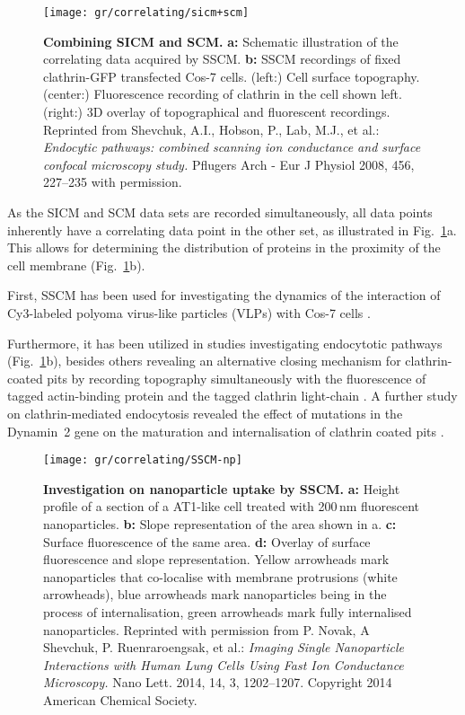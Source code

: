 \begin{figure}
  \texttt{[image: gr/correlating/sicm+scm]}
  \caption{%
    \textbf{Combining SICM and SCM.}
    \textbf{a:} Schematic illustration of the correlating data acquired by SSCM.
    \textbf{b:} SSCM recordings of fixed clathrin-GFP transfected Cos-7 cells. 
    	(left:) Cell surface topography. 
    	(center:) Fluorescence recording of clathrin in the cell shown left. 
    	(right:) 3D overlay of topographical and fluorescent recordings. 
    Reprinted from Shevchuk, A.I., Hobson, P., Lab, M.J., et al.: \emph{Endocytic
    pathways: combined scanning ion conductance and surface confocal
    microscopy study.} Pflugers Arch - Eur J Physiol 2008, 456, 227–235 with permission.
  }
  \label{fig:sicm+scm}
\end{figure}

As the SICM and SCM data sets are recorded simultaneously, all data points
inherently have a correlating data point in the other set, as illustrated in
Fig.~\ref{fig:sicm+scm}a. This allows for determining the distribution of
proteins in the proximity of the cell membrane (Fig.~\ref{fig:sicm+scm}b).



First, SSCM has been used for investigating the dynamics of the interaction of
Cy3-labeled polyoma virus-like particles (VLPs) with Cos-7 cells
\cite{Gorelik2002a}.

Furthermore, it has been utilized in studies investigating endocytotic
pathways \cite{Shevchuk2008a} (Fig.~\ref{fig:sicm+scm}b), besides others
revealing an alternative closing mechanism for clathrin-coated pits by
recording topography simultaneously with the fluorescence of tagged
actin-binding protein and the tagged clathrin light-chain
\cite{Shevchuk2012}. A further study on clathrin-mediated endocytosis revealed
the effect of mutations in the Dynamin~2 gene on the maturation and
internalisation of clathrin coated pits \cite{Ali2019}.

\begin{figure}
  \centering
  \texttt{[image: gr/correlating/SSCM-np]}
  \caption{%
    \textbf{Investigation on nanoparticle uptake by SSCM.}  \textbf{a:} Height
    profile of a section of a AT1-like cell treated with 200\,nm fluorescent
    nanoparticles.  \textbf{b:} Slope representation of the area shown in a.
    \textbf{c:} Surface fluorescence of the same area.  \textbf{d:} Overlay
    of surface fluorescence and slope representation. Yellow arrowheads mark
    nanoparticles that co-localise with membrane protrusions (white
    arrowheads), blue arrowheads mark nanoparticles being in the process of
    internalisation, green arrowheads mark fully internalised nanoparticles.
    Reprinted with permission from P. Novak, A Shevchuk, P. Ruenraroengsak, et
    al.: \emph{Imaging Single Nanoparticle Interactions with Human Lung Cells
      Using Fast Ion Conductance Microscopy.} Nano Lett. 2014, 14, 3,
    1202–1207. Copyright 2014 American Chemical Society.}
  \label{fig:sscm-np}
\end{figure}


